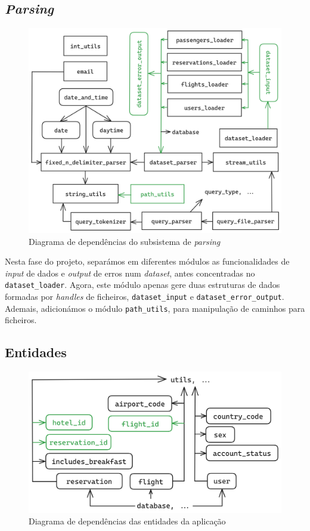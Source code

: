 \documentclass[11pt, a4paper]{article}
\begin{document}
\subsection{\emph{Parsing}}
\label{sec:parsing}

\begin{figure}[ht]
    \centering
    \includegraphics[scale=0.17]{res-fase2/parsing.png}
    \caption{Diagrama de dependências do subsistema de \emph{parsing}}
    \label{fig:parsing}
\end{figure}

Nesta fase do projeto, separámos em diferentes módulos as funcionalidades de \emph{input} de dados
e \emph{output} de erros num \emph{dataset}, antes concentradas no \texttt{dataset\_loader}. Agora,
este módulo apenas gere duas estruturas de dados formadas por \emph{handles} de ficheiros,
\texttt{dataset\_input} e \texttt{dataset\_error\_output}. Ademais, adicionámos o módulo
\texttt{path\_utils}, para manipulação de caminhos para ficheiros.

\subsection{Entidades}
\label{sec:entities}

\begin{figure}[ht]
    \centering
    \includegraphics[scale=0.2]{res-fase2/entities.png}
    \caption{Diagrama de dependências das entidades da aplicação}
    \label{fig:entities}
\end{figure}
\end{document}
